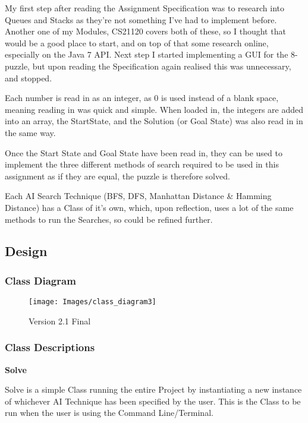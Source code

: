 \documentclass[11pt]{article} %
\begin{document}
					My first step after reading the Assignment Specification was to research into Queues and Stacks as they're not something I've had to implement before. Another one of my Modules, CS21120 covers both of these, so I thought that would be a good place to start, and on top of that some research online, especially on the Java 7 API. Next step I started implementing a GUI for the 8-puzzle, but upon reading the Specification again realised this was unnecessary, and stopped.
	
					Each number is read in as an integer, as 0 is used instead of a blank space, meaning reading in was quick and simple. When loaded in, the integers are added into an array, the StartState, and the Solution (or Goal State) was also read in in the same way.
	
					Once the Start State and Goal State have been read in, they can be used to implement the three different methods of search required to be used in this assignment as if they are equal, the puzzle is therefore solved.
	
					Each AI Search Technique (BFS, DFS, Manhattan Distance \& Hamming Distance) has a Class of it's own, which, upon reflection, uses a lot of the same methods to run the Searches, so could be refined further.
	
	\newpage
		\subsection{Design}
	
			\subsubsection{Class Diagram}
	
				\begin{figure}[ht!]
					\centering
					\texttt{[image: Images/class\_diagram3]}
					\label{overflow}
					\caption{Version 2.1 Final}
				\end{figure}
	
	\newpage
		\subsubsection{Class Descriptions}
			\setlength{\parindent}{0pt} %
	
			\textbf{Solve}
	
			Solve is a simple Class running the entire Project by instantiating a new instance of whichever AI Technique has been specified by the user. This is the Class to be run when the user is using the Command Line/Terminal.
	
\end{document}
